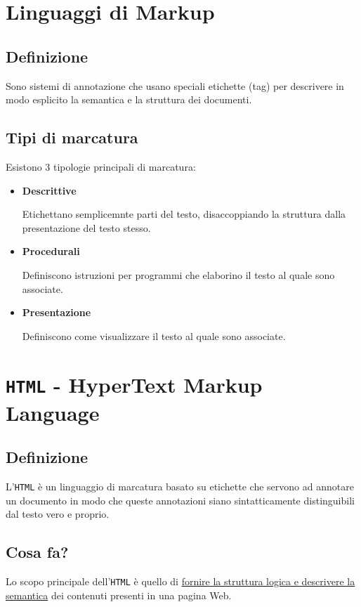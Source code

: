 \chapter{Linguaggi di Markup}
\section{Definizione}
Sono sistemi di annotazione che usano speciali etichette (tag) per descrivere in modo esplicito la semantica e la struttura dei documenti.

\section{Tipi di marcatura}
Esistono 3 tipologie principali di marcatura:
    
    \begin{itemize}
        \item \textbf{Descrittive}

        Etichettano semplicemnte parti del testo, disaccoppiando la struttura dalla presentazione del testo stesso.

        \item \textbf{Procedurali}

        Definiscono istruzioni per programmi che elaborino il testo al quale sono associate.

        \item \textbf{Presentazione}

        Definiscono come visualizzare il testo al quale sono associate.
    \end{itemize}

\chapter{\texttt{HTML} - HyperText Markup Language}
\section{Definizione}
L'\texttt{HTML} è un linguaggio di marcatura basato su etichette che servono ad annotare un documento in modo che queste annotazioni siano sintatticamente distinguibili dal testo vero e proprio.

\section{Cosa fa?}
Lo scopo principale dell'\texttt{HTML} è quello di \uline{fornire la struttura logica e descrivere la semantica} dei contenuti presenti in una pagina Web.

